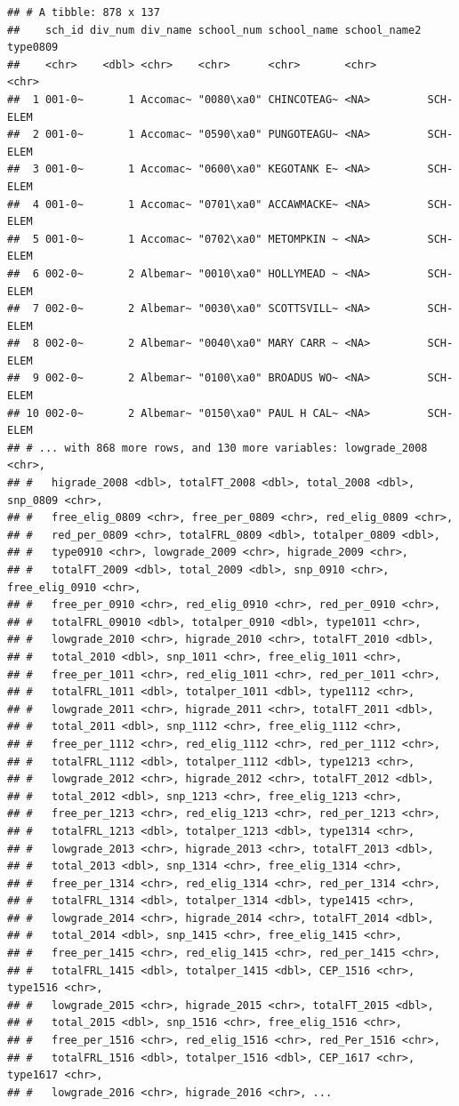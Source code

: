 \documentclass[
]{book}
\begin{document}
\begin{verbatim}
## # A tibble: 878 x 137
##    sch_id div_num div_name school_num school_name school_name2 type0809
##    <chr>    <dbl> <chr>    <chr>      <chr>       <chr>        <chr>   
##  1 001-0~       1 Accomac~ "0080\xa0" CHINCOTEAG~ <NA>         SCH-ELEM
##  2 001-0~       1 Accomac~ "0590\xa0" PUNGOTEAGU~ <NA>         SCH-ELEM
##  3 001-0~       1 Accomac~ "0600\xa0" KEGOTANK E~ <NA>         SCH-ELEM
##  4 001-0~       1 Accomac~ "0701\xa0" ACCAWMACKE~ <NA>         SCH-ELEM
##  5 001-0~       1 Accomac~ "0702\xa0" METOMPKIN ~ <NA>         SCH-ELEM
##  6 002-0~       2 Albemar~ "0010\xa0" HOLLYMEAD ~ <NA>         SCH-ELEM
##  7 002-0~       2 Albemar~ "0030\xa0" SCOTTSVILL~ <NA>         SCH-ELEM
##  8 002-0~       2 Albemar~ "0040\xa0" MARY CARR ~ <NA>         SCH-ELEM
##  9 002-0~       2 Albemar~ "0100\xa0" BROADUS WO~ <NA>         SCH-ELEM
## 10 002-0~       2 Albemar~ "0150\xa0" PAUL H CAL~ <NA>         SCH-ELEM
## # ... with 868 more rows, and 130 more variables: lowgrade_2008 <chr>,
## #   higrade_2008 <dbl>, totalFT_2008 <dbl>, total_2008 <dbl>, snp_0809 <chr>,
## #   free_elig_0809 <chr>, free_per_0809 <chr>, red_elig_0809 <chr>,
## #   red_per_0809 <chr>, totalFRL_0809 <dbl>, totalper_0809 <dbl>,
## #   type0910 <chr>, lowgrade_2009 <chr>, higrade_2009 <chr>,
## #   totalFT_2009 <dbl>, total_2009 <dbl>, snp_0910 <chr>, free_elig_0910 <chr>,
## #   free_per_0910 <chr>, red_elig_0910 <chr>, red_per_0910 <chr>,
## #   totalFRL_09010 <dbl>, totalper_0910 <dbl>, type1011 <chr>,
## #   lowgrade_2010 <chr>, higrade_2010 <chr>, totalFT_2010 <dbl>,
## #   total_2010 <dbl>, snp_1011 <chr>, free_elig_1011 <chr>,
## #   free_per_1011 <chr>, red_elig_1011 <chr>, red_per_1011 <chr>,
## #   totalFRL_1011 <dbl>, totalper_1011 <dbl>, type1112 <chr>,
## #   lowgrade_2011 <chr>, higrade_2011 <chr>, totalFT_2011 <dbl>,
## #   total_2011 <dbl>, snp_1112 <chr>, free_elig_1112 <chr>,
## #   free_per_1112 <chr>, red_elig_1112 <chr>, red_per_1112 <chr>,
## #   totalFRL_1112 <dbl>, totalper_1112 <dbl>, type1213 <chr>,
## #   lowgrade_2012 <chr>, higrade_2012 <chr>, totalFT_2012 <dbl>,
## #   total_2012 <dbl>, snp_1213 <chr>, free_elig_1213 <chr>,
## #   free_per_1213 <chr>, red_elig_1213 <chr>, red_per_1213 <chr>,
## #   totalFRL_1213 <dbl>, totalper_1213 <dbl>, type1314 <chr>,
## #   lowgrade_2013 <chr>, higrade_2013 <chr>, totalFT_2013 <dbl>,
## #   total_2013 <dbl>, snp_1314 <chr>, free_elig_1314 <chr>,
## #   free_per_1314 <chr>, red_elig_1314 <chr>, red_per_1314 <chr>,
## #   totalFRL_1314 <dbl>, totalper_1314 <dbl>, type1415 <chr>,
## #   lowgrade_2014 <chr>, higrade_2014 <chr>, totalFT_2014 <dbl>,
## #   total_2014 <dbl>, snp_1415 <chr>, free_elig_1415 <chr>,
## #   free_per_1415 <chr>, red_elig_1415 <chr>, red_per_1415 <chr>,
## #   totalFRL_1415 <dbl>, totalper_1415 <dbl>, CEP_1516 <chr>, type1516 <chr>,
## #   lowgrade_2015 <chr>, higrade_2015 <chr>, totalFT_2015 <dbl>,
## #   total_2015 <dbl>, snp_1516 <chr>, free_elig_1516 <chr>,
## #   free_per_1516 <chr>, red_elig_1516 <chr>, red_Per_1516 <chr>,
## #   totalFRL_1516 <dbl>, totalper_1516 <dbl>, CEP_1617 <chr>, type1617 <chr>,
## #   lowgrade_2016 <chr>, higrade_2016 <chr>, ...
\end{verbatim}
\end{document}
